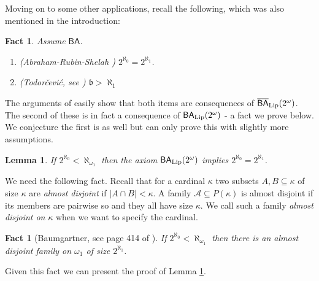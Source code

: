 \documentclass[leqno,11pt]{amsart}
\newtheorem{lemma}[theorem]{Lemma}
\newtheorem{fact}[theorem]{Fact}
\theoremstyle{definition}
\theoremstyle{remark}
\def\BA{\mathsf{BA}}
\def\cantor{2^\omega}
\def\mfb{\mathfrak b}
\def\cc{2^{\aleph_0}}
\begin{document}
Moving on to some other applications, recall the following, which was also mentioned in the introduction:

\begin{fact}
    Assume $\BA$.
    \begin{enumerate}
        \item (Abraham-Rubin-Shelah \cite[Theorem 7.1]{ARS85}) $\cc = 2^{\aleph_1}$.

        \item (Todor\v{c}evi\'{c}, see \cite{Todorcevic89}) $\mfb > \aleph_1$
    \end{enumerate}
\end{fact}

The arguments of \cite[Section 3]{weakBA} easily show that both items are consequences of $\overline{\BA}_{\rm Lip}(\cantor)$. The second of these is in fact a consequence of $\BA_{\rm Lip}(2^\omega)$ - a fact we prove below. We conjecture the first is as well but can only prove this with slightly more assumptions. 

\begin{lemma} \label{cardinal arithmetic}
    If $\cc < \aleph_{\omega_1}$ then the axiom $\BA_{\rm Lip}(2^\omega)$ implies $\cc = 2^{\aleph_1}$.
\end{lemma}

We need the following fact. Recall that for a cardinal $\kappa$ two subsets $A, B \subseteq \kappa$ of size $\kappa$ are {\em almost disjoint} if $|A \cap B| < \kappa$. A family $\mathcal A \subseteq P(\kappa)$ is {\rm almost disjoint} if its members are pairwise so and they all have size $\kappa$. We call such a family {\em almost disjoint on} $\kappa$ when we want to specify the cardinal.

\begin{fact}[Baumgartner, see page 414 of \cite{ADBaum}]
    If $\cc < \aleph_{\omega_1}$ then there is an almost disjoint family on $\omega_1$ of size $2^{\aleph_1}$. 
\end{fact}

Given this fact we can present the proof of Lemma \ref{cardinal arithmetic}.
\end{document}
